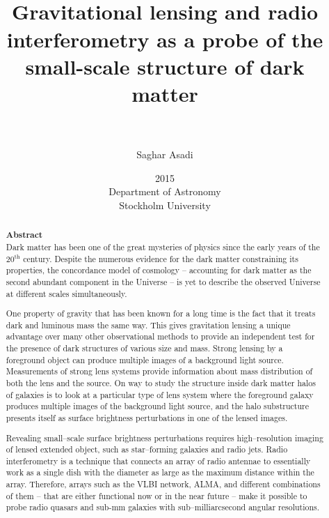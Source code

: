 \documentclass[paper=a4, fontsize=11pt]{scrartcl} %
\title{    
\normalfont \normalsize 
\horrule{0.5pt} \\[0.4cm] %
\huge Gravitational lensing and radio interferometry as a probe of the small-scale structure of dark matter\\
\horrule{2pt} \\[0.5cm] %
}
\author{Saghar Asadi} %
\date{\normalsize 2015 \\ Department of Astronomy \\ Stockholm University} %
\numberwithin{equation}{section} %
\numberwithin{figure}{section} %
\numberwithin{table}{section} %
\begin{document}
\maketitle %
\newpage
\tableofcontents
\newpage

\begin{abstract}
{\Large \bf Abstract}\\


Dark matter has been one of the great mysteries of physics since the early years of the 20$^\mathrm{th}$ century. Despite the numerous evidence for the dark matter constraining its properties, the concordance model of cosmology -- accounting for dark matter as the second abundant component in the Universe -- is yet to describe the observed Universe at different scales simultaneously.

One property of gravity that has been known for a long time is the fact that it treats dark and luminous mass the same way. This gives gravitation lensing a unique advantage over many other observational methods to provide an independent test for the presence of dark structures of various size and mass. Strong lensing by a foreground object can produce multiple images of a background light source. Measurements of strong lens systems provide information about mass distribution of both the lens and the source. On way to study the structure inside dark matter halos of galaxies is to look at a particular type of lens system where the foreground galaxy produces multiple images of the background light source, and the halo substructure presents itself as surface brightness perturbations in one of the lensed images.

Revealing small--scale surface brightness perturbations requires high--resolution imaging of lensed extended object, such as star--forming galaxies and radio jets. Radio interferometry is a technique that connects an array of radio antennae to essentially work as a single dish with the diameter as large as the maximum distance within the array. Therefore, arrays such as the VLBI network, ALMA, and different combinations of them -- that are either functional now or in the near future -- make it possible to probe radio quasars and sub-mm galaxies with sub--milliarcsecond angular resolutions.


\end{abstract}
\end{document}
